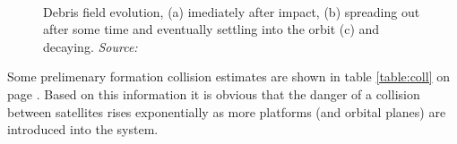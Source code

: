 \begin{figure}
  \centering
  \\
  \caption{Debris field evolution, (a) imediately after impact, (b) spreading out after some time and eventually settling into the orbit (c) and decaying. \emph{Source: \cite{constDesign}}}
  \label{fig:debris}
\end{figure}

Some prelimenary formation collision estimates are shown in table \ref{table:coll} on page \pageref{table:coll}. Based on this information it is obvious that the danger of a collision  between satellites rises exponentially as more platforms (and orbital planes) are introduced into the system.

